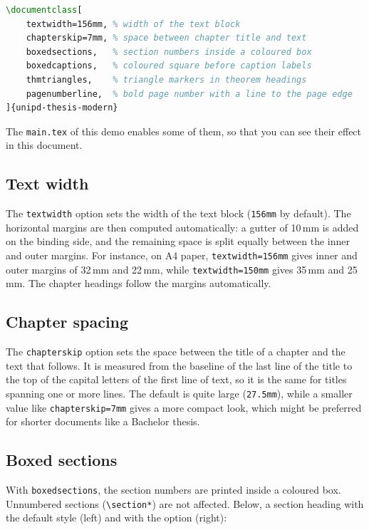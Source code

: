 \begin{lstlisting}[language=TeX]
\documentclass[
    textwidth=156mm, % width of the text block
    chapterskip=7mm, % space between chapter title and text
    boxedsections,   % section numbers inside a coloured box
    boxedcaptions,   % coloured square before caption labels
    thmtriangles,    % triangle markers in theorem headings
    pagenumberline,  % bold page number with a line to the page edge
]{unipd-thesis-modern}
\end{lstlisting}

The \texttt{main.tex} of this demo enables some of them, so that you can see their effect in this document.

\subsection{Text width}

The \texttt{textwidth} option sets the width of the text block (\texttt{156mm} by default).
The horizontal margins are then computed automatically: a gutter of 10\,mm is added on the binding side, and the remaining space is split equally between the inner and outer margins.
For instance, on A4 paper, \texttt{textwidth=156mm} gives inner and outer margins of 32\,mm and 22\,mm, while \texttt{textwidth=150mm} gives 35\,mm and 25\,mm.
The chapter headings follow the margins automatically.

\subsection{Chapter spacing}

The \texttt{chapterskip} option sets the space between the title of a chapter and the text that follows.
It is measured from the baseline of the last line of the title to the top of the capital letters of the first line of text, so it is the same for titles spanning one or more lines.
The default is quite large (\texttt{27.5mm}), while a smaller value like \texttt{chapterskip=7mm} gives a more compact look, which might be preferred for shorter documents like a Bachelor thesis.

\subsection{Boxed sections}

With \texttt{boxedsections}, the section numbers are printed inside a coloured box.
Unnumbered sections (\verb|\section*|) are not affected.
Below, a section heading with the default style (left) and with the option (right):

